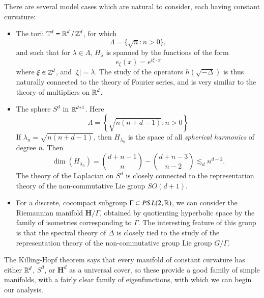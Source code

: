 There are several model cases which are natural to consider, each having constant curvature:
%
\begin{itemize}
    \item The torii $\operatorname{\mathbb{T}}^d = \operatorname{\mathbb{R}}^d / \operatorname{\mathbb{Z}}^d$, for which
    \[ \Lambda = \{ \sqrt{n}: n > 0 \}, \]
    and such that for $\lambda \in \Lambda$, $H_\lambda$ is spanned by the functions of the form
    \[ e_\xi(x) = e^{i \xi \cdot x} \]
    where $\xi \in \operatorname{\mathbb{Z}}^d$, and $|\xi| = \lambda$. The study of the operators $h(\sqrt{-\Delta})$ is thus naturally connected to the theory of Fourier series, and is very similar to the theory of multipliers on $\operatorname{\mathbb{R}}^d$.

    \item The sphere $S^d$ in $\operatorname{\mathbb{R}}^{d+1}$. Here
    \[ \Lambda = \left\{ \sqrt{n(n+d-1)}: n > 0 \right\} \]
    If $\lambda_n = \sqrt{n(n+d-1)}$, then $H_{\lambda_n}$ is the space of all \emph{spherical harmonics} of degree $n$. Then
    \[ \dim(H_{\lambda_n}) = \binom{d + n - 1}{n} - \binom{d + n - 3}{n - 2} \lesssim_d n^{d-2}. \]
    The theory of the Laplacian on $S^d$ is closely connected to the representation theory of the non-commutative Lie group $SO(d+1)$.

    \item For a discrete, cocompact subgroup $\Gamma \subset PSL(2,\operatorname{\mathbb{R}})$, we can consider the Riemannian manifold $\mathbf{H} / \Gamma$, obtained by quotienting hyperbolic space by the family of isometries corresponding to $\Gamma$. The interesting feature of this group is that the spectral theory of $\Delta$ is closely tied to the study of the representation theory of the non-commutative group Lie group $G / \Gamma$.
\end{itemize}
%
The Killing-Hopf theorem says that every manifold of constant curvature has either $\operatorname{\mathbb{R}}^d$, $S^d$, or $\mathbf{H}^d$ as a universal cover, so these provide a good family of simple manifolds, with a fairly clear family of eigenfunctions, with which we can begin our analysis.

